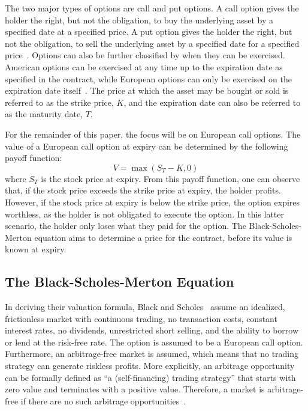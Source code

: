 \documentclass[12pt, onecolumn, journal]{IEEEtran}
\begin{document}
The two major types of options are call and put options. A call option gives the holder the right, but not the obligation, to buy the underlying asset by a specified date at a specified price. A put option gives the holder the right, but not the obligation, to sell the underlying asset by a specified date for a specified price~\cite{Hull2022}. Options can also be further classified by when they can be exercised. American options can be exercised at any time up to the expiration date as specified in the contract, while European options can only be exercised on the expiration date itself~\cite{BlackScholes1973}. The price at which the asset may be bought or sold is referred to as the strike price, $K$, and the expiration date can also be referred to as the maturity date, $T$.

For the remainder of this paper, the focus will be on European call options. The value of a European call option at expiry can be determined by the following payoff function:
\begin{equation}
    V = \max(S_T - K, 0)
\end{equation}
where $S_T$ is the stock price at expiry. From this payoff function, one can observe that, if the stock price exceeds the strike price at expiry, the holder profits. However, if the stock price at expiry is below the strike price, the option expires worthless, as the holder is not obligated to execute the option. In this latter scenario, the holder only loses what they paid for the option. The Black-Scholes-Merton equation aims to determine a price for the contract, before its value is known at expiry.

\subsection{The Black-Scholes-Merton Equation}
In deriving their valuation formula, Black and Scholes~\cite{BlackScholes1973} assume an idealized, frictionless market with continuous trading, no transaction costs, constant interest rates, no dividends, unrestricted short selling, and the ability to borrow or lend at the risk-free rate. The option is assumed to be a European call option. Furthermore, an arbitrage-free market is assumed, which means that no trading strategy can generate riskless profits. More explicitly, an arbitrage opportunity can be formally defined as “a (self-financing) trading strategy” that starts with zero value and terminates with a positive value. Therefore, a market is arbitrage-free if there are no such arbitrage opportunities~\cite{BaxterRennie1996}.
\end{document}
